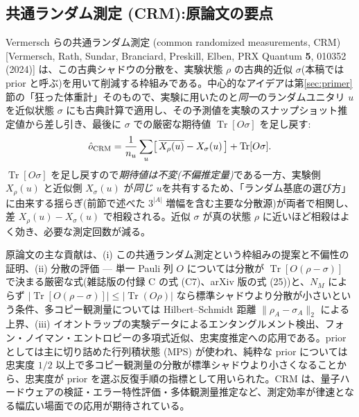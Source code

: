 \documentclass[11pt,a4paper]{ltjsarticle}
\newcommand{\Tr}{\operatorname{Tr}}
\begin{document}
\subsection{共通ランダム測定 (CRM):原論文の要点}
\label{sec:crm-orig}
Vermersch らの共通ランダム測定 (common randomized measurements, CRM)[Vermersch, Rath, Sundar, Branciard, Preskill, Elben, PRX Quantum \textbf{5}, 010352 (2024)] は、この古典シャドウの分散を、実験状態 $\rho$ の古典的近似 $\sigma$(本稿では prior と呼ぶ)を用いて削減する枠組みである。中心的なアイデアは第\ref{sec:primer}節の「狂った体重計」そのもので、実験に用いたのと\emph{同一}のランダムユニタリ $u$ を近似状態 $\sigma$ にも古典計算で適用し、その予測値を実験のスナップショット推定値から差し引き、最後に $\sigma$ での厳密な期待値 $\Tr[O\sigma]$ を足し戻す:
\begin{equation}
  \hat o_{\rm CRM} = \frac{1}{n_u}\sum_u \bigl[\,\overline{X_\rho(u)} - X_\sigma(u)\,\bigr] + \Tr[O\sigma].
  \label{eq:crm}
\end{equation}
$\Tr[O\sigma]$ を足し戻すので\emph{期待値は不変(不偏推定量)}である一方、実験側 $X_\rho(u)$ と近似側 $X_\sigma(u)$ が\emph{同じ $u$}を共有するため、「ランダム基底の選び方」に由来する揺らぎ(前節で述べた $3^{|A|}$ 増幅を含む主要な分散源)が両者で相関し、差 $X_\rho(u)-X_\sigma(u)$ で相殺される。近似 $\sigma$ が真の状態 $\rho$ に近いほど相殺はよく効き、必要な測定回数が減る。

原論文の主な貢献は、(i) この共通ランダム測定という枠組みの提案と不偏性の証明、(ii) 分散の評価 --- 単一 Pauli 列 $O$ については分散が $\Tr[O(\rho-\sigma)]$ で決まる厳密な式(雑誌版の付録 C の式 (C7)、arXiv 版の式 (25))と、$N_M$ によらず $|\Tr[O(\rho-\sigma)]|\le|\Tr(O\rho)|$ なら標準シャドウより分散が小さいという条件、多コピー観測量については Hilbert--Schmidt 距離 $\|\rho_A-\sigma_A\|_2$ による上界、(iii) イオントラップの実験データによるエンタングルメント検出、フォン・ノイマン・エントロピーの多項式近似、忠実度推定への応用である。prior としては主に切り詰めた行列積状態 (MPS) が使われ、純粋な prior については忠実度 $1/2$ 以上で多コピー観測量の分散が標準シャドウより小さくなることから、忠実度が prior を選ぶ反復手順の指標として用いられた。CRM は、量子ハードウェアの検証・エラー特性評価・多体観測量推定など、測定効率が律速となる幅広い場面での応用が期待されている。
\end{document}
